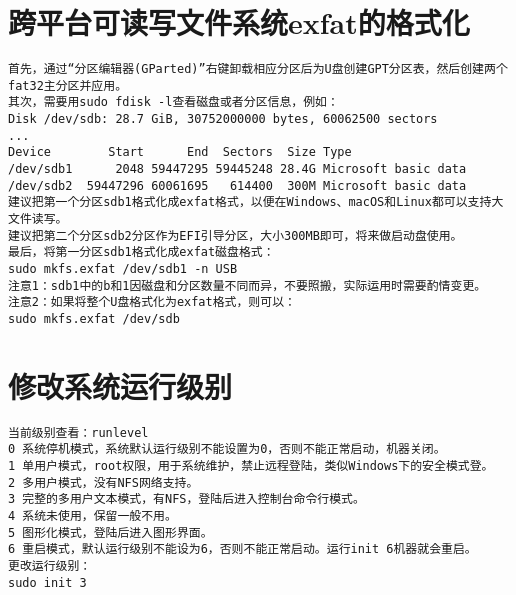 \documentclass[a4paper,fontset=fandol,zihao=-4,linespread=1.2]{ctexbook}
\begin{document}
\section{跨平台可读写文件系统exfat的格式化}
\begin{lstlisting}
首先，通过“分区编辑器(GParted)”右键卸载相应分区后为U盘创建GPT分区表，然后创建两个fat32主分区并应用。
其次，需要用sudo fdisk -l查看磁盘或者分区信息，例如：
Disk /dev/sdb: 28.7 GiB, 30752000000 bytes, 60062500 sectors
...
Device        Start      End  Sectors  Size Type
/dev/sdb1      2048 59447295 59445248 28.4G Microsoft basic data
/dev/sdb2  59447296 60061695   614400  300M Microsoft basic data
建议把第一个分区sdb1格式化成exfat格式，以便在Windows、macOS和Linux都可以支持大文件读写。
建议把第二个分区sdb2分区作为EFI引导分区，大小300MB即可，将来做启动盘使用。
最后，将第一分区sdb1格式化成exfat磁盘格式：
sudo mkfs.exfat /dev/sdb1 -n USB
注意1：sdb1中的b和1因磁盘和分区数量不同而异，不要照搬，实际运用时需要酌情变更。
注意2：如果将整个U盘格式化为exfat格式，则可以：
sudo mkfs.exfat /dev/sdb
\end{lstlisting}

\section{修改系统运行级别}
\begin{lstlisting}
当前级别查看：runlevel
0 系统停机模式，系统默认运行级别不能设置为0，否则不能正常启动，机器关闭。
1 单用户模式，root权限，用于系统维护，禁止远程登陆，类似Windows下的安全模式登。
2 多用户模式，没有NFS网络支持。
3 完整的多用户文本模式，有NFS，登陆后进入控制台命令行模式。
4 系统未使用，保留一般不用。
5 图形化模式，登陆后进入图形界面。
6 重启模式，默认运行级别不能设为6，否则不能正常启动。运行init 6机器就会重启。
更改运行级别：
sudo init 3
\end{lstlisting}
\end{document}
